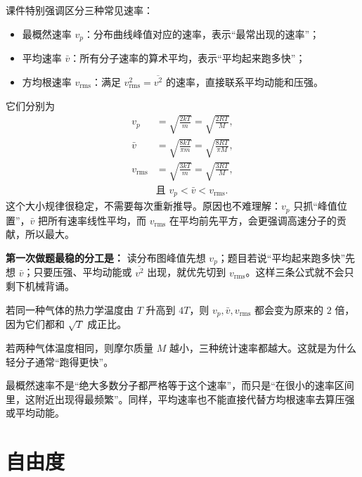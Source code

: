 \documentclass[lang=cn,11pt]{elegantbook}
\begin{document}
课件特别强调区分三种常见速率：
\begin{itemize}
  \item 最概然速率 \(v_p\)：分布曲线峰值对应的速率，表示“最常出现的速率”；
  \item 平均速率 \(\bar v\)：所有分子速率的算术平均，表示“平均起来跑多快”；
  \item 方均根速率 \(v_{\mathrm{rms}}\)：满足 \(v_{\mathrm{rms}}^2=\overline{v^2}\) 的速率，直接联系平均动能和压强。
\end{itemize}

它们分别为
\[
\begin{aligned}
v_p&=\sqrt{\frac{2kT}{m}}=\sqrt{\frac{2RT}{M}},\\
\bar v&=\sqrt{\frac{8kT}{\pi m}}=\sqrt{\frac{8RT}{\pi M}},\\
v_{\mathrm{rms}}&=\sqrt{\frac{3kT}{m}}=\sqrt{\frac{3RT}{M}},\\
&\text{且 }v_p<\bar v<v_{\mathrm{rms}}.
\end{aligned}
\]
这个大小规律很稳定，不需要每次重新推导。原因也不难理解：\(v_p\) 只抓“峰值位置”，\(\bar v\) 把所有速率线性平均，而 \(v_{\mathrm{rms}}\) 在平均前先平方，会更强调高速分子的贡献，所以最大。

\begin{note}
\textbf{第一次做题最稳的分工是：} 读分布图峰值先想 \(v_p\)；题目若说“平均起来跑多快”先想 \(\bar v\)；只要压强、平均动能或 \(\overline{v^2}\) 出现，就优先切到 \(v_{\mathrm{rms}}\)。这样三条公式就不会只剩下机械背诵。
\end{note}

\begin{example}[怎样快速判断三种统计速率的变化]
若同一种气体的热力学温度由 \(T\) 升高到 \(4T\)，则 \(v_p,\bar v,v_{\mathrm{rms}}\) 都会变为原来的 \(2\) 倍，因为它们都和 \(\sqrt{T}\) 成正比。

若两种气体温度相同，则摩尔质量 \(M\) 越小，三种统计速率都越大。这就是为什么轻分子通常“跑得更快”。
\end{example}

\begin{remark}
最概然速率不是“绝大多数分子都严格等于这个速率”，而只是“在很小的速率区间里，这附近出现得最频繁”。同样，平均速率也不能直接代替方均根速率去算压强或平均动能。
\end{remark}

\section{自由度}
\end{document}
